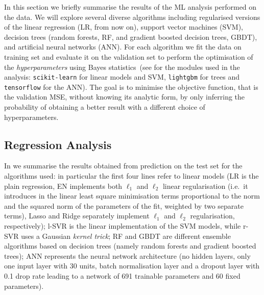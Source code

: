 In this section we briefly summarise the results of the ML analysis performed
on the data.
We will explore several diverse algorithms including regularised versions of
the linear regression (LR, from now on), support vector machines (SVM),
decision trees (random forests, RF, and gradient boosted decision trees, GBDT),
and artificial neural networks (ANN).
For each algorithm we fit the data on training set and evaluate it on the
validation set to perform the optimisation of the \textit{hyperparameters}
using Bayes
statistics~(see
\cite{Pedregosa:2011:ScikitLearn,Head:2018:ScikitOptimize,Ke:2017:LightGBM,Abadi:2015:TensorFlow}
for the modules used in the analysis: \texttt{scikit-learn} for linear models
and SVM, \texttt{lightgbm} for trees and \texttt{tensorflow} for the ANN).
The goal is to minimise the objective function, that is the validation MSE,
without knowing its analytic form, by only inferring the probability of
obtaining a better result with a different choice of hyperparameters.

\subsection{Regression Analysis}\label{sec:ml:regr}

In  we summarise the results obtained from prediction on the
test set for the algorithms used: in particular the first four lines refer to
linear models (LR is the plain regression, EN implements both $\ell_1$ and
$\ell_2$ linear regularisation (i.e.\ it introduces in the linear least square
minimisation terms proportional to the norm and the squared norm of the
parameters of the fit, weighted by two separate terms), Lasso and Ridge
separately implement $\ell_1$ and $\ell_2$ regularisation, respectively); l-SVR
is the linear implementation of the SVM models, while r-SVR uses a Gaussian
\textit{kernel trick}; RF and GBDT are different ensemble algorithms based on
decision trees (namely random forests and gradient boosted trees); ANN
represents the neural network architecture (no hidden layers, only one input
layer with 30 units, batch normalisation layer and a dropout layer with 0.1
drop rate leading to a network of 691 trainable parameters and 60 fixed
parameters).

